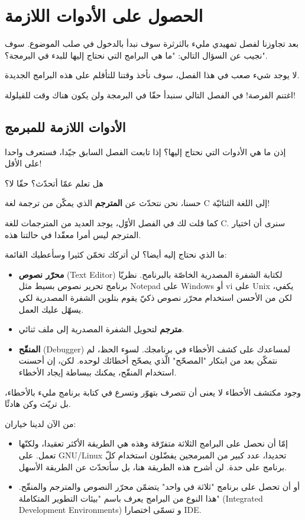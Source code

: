 \chapter{الحصول على الأدوات اللازمة}

بعد تجاوزنا لفصل تمهيدي مليء بالثرثرة سوف نبدأ بالدخول في صلب الموضوع. سوف نجيب عن السؤال التالي: "ما هي البرامج التي نحتاج إليها للبدء في البرمجة؟".

لا يوجد شيء صعب في هذا الفصل، سوف نأخذ وقتنا للتأقلم على هذه البرامج الجديدة.

اغتنم الفرصة! في الفصل التالي سنبدأ حقّا في البرمجة ولن يكون هناك وقت للقيلولة!

\section{الأدوات اللازمة للمبرمج}

إذن ما هي الأدوات التي نحتاج إليها؟
إذا تابعت الفصل السابق جيّدا، فستعرف واحدا على الأقل!

هل تعلم عمّا أتحدّث؟ حقّا لا؟

حسنا، نحن نتحدّث عن
\textbf{المترجم}
الذي يمكّن من ترجمة لغة \textenglish{C}
إلى اللغة الثنائيّة!

كما قلت لك في الفصل الأوّل، يوجد العديد من المترجمات للغة \textenglish{C}.
سنرى أن اختيار المترجم ليس أمرا معقّدا في حالتنا هذه.

ما الذي نحتاج إليه أيضا؟ لن أتركك تخمّن كثيرا وسأعطيك القائمة:

\begin{itemize}
  \item \textbf{محرّر نصوص }
(\textenglish{Text Editor})
لكتابة الشفرة المصدرية الخاصّة بالبرنامح. نظريّا برنامج تحرير نصوص بسيط مثل
\textenglish{Notepad}
على
\textenglish{Windows}
أو
\textenglish{vi}
على
\textenglish{Unix}
يكفي، لكن من الأحسن استخدام محرّر نصوص ذكيّ يقوم بتلوين الشفرة المصدرية لكي يسهّل عليك العمل.
  \item \textbf{مترجم}
  لتحويل الشفرة المصدرية إلى ملف ثنائي.
  \item \textbf{المنقّح}
(\textenglish{Debugger})
لمساعدك على كشف الأخطاء في برنامجك. لسوء الحظ، لم نتمكّن بعد من ابتكار "المصحّح" الّذي يصحّح أخطائك لوحده. لكن، إن أحسنت استخدام المنقّح، يمكنك ببساطة إيجاد الأخطاء.
\end{itemize}

وجود مكتشف الأخطاء لا يعنى أن تتصرف بتهوّر وتسرع في كتابة برنامج مليء بالأخطاء، بل تريّث وكن هادئًا.

من الآن لدينا خياران:

\begin{itemize}
  \item إمّا أن نحصل على البرامج الثلاثة متفرّقة وهذه هي الطريقة الأكثر تعقيدا، ولكنّها تعمل. على
\textenglish{GNU/Linux}
تحديدا، عدد كبير من المبرمجين يفضّلون استخدام كلّ برنامج على حدة. لن أشرح هذه الطريقة هنا، بل سأتحدّث عن الطريقة الأسهل.
  \item أو أن تحصل على برنامج "ثلاثة في واحد" يتضمّن محرّر النصوص والمترجم والمنقّح. هذا النوع من البرامج يعرف باسم "بيئات التطوير المتكاملة"
(\textenglish{Integrated Development Environments})
و تسمّى اختصارا
\textenglish{IDE}.
\end{itemize}

